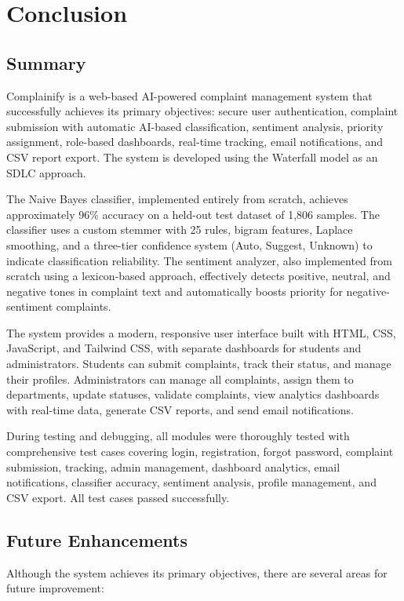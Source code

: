 \documentclass[12pt,a4paper]{report}
\begin{document}
\chapter{Conclusion}

\section{Summary}
Complainify is a web-based AI-powered complaint management system that successfully achieves its primary objectives: secure user authentication, complaint submission with automatic AI-based classification, sentiment analysis, priority assignment, role-based dashboards, real-time tracking, email notifications, and CSV report export. The system is developed using the Waterfall model as an SDLC approach.

The Naive Bayes classifier, implemented entirely from scratch, achieves approximately 96\% accuracy on a held-out test dataset of 1,806 samples. The classifier uses a custom stemmer with 25 rules, bigram features, Laplace smoothing, and a three-tier confidence system (Auto, Suggest, Unknown) to indicate classification reliability. The sentiment analyzer, also implemented from scratch using a lexicon-based approach, effectively detects positive, neutral, and negative tones in complaint text and automatically boosts priority for negative-sentiment complaints.

The system provides a modern, responsive user interface built with HTML, CSS, JavaScript, and Tailwind CSS, with separate dashboards for students and administrators. Students can submit complaints, track their status, and manage their profiles. Administrators can manage all complaints, assign them to departments, update statuses, validate complaints, view analytics dashboards with real-time data, generate CSV reports, and send email notifications.

During testing and debugging, all modules were thoroughly tested with comprehensive test cases covering login, registration, forgot password, complaint submission, tracking, admin management, dashboard analytics, email notifications, classifier accuracy, sentiment analysis, profile management, and CSV export. All test cases passed successfully.

\section{Future Enhancements}
Although the system achieves its primary objectives, there are several areas for future improvement:
\end{document}
